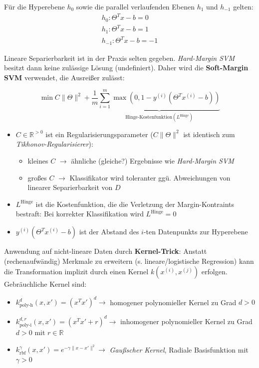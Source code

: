 Für die Hyperebene $h_0$ sowie die parallel verlaufenden Ebenen $h_1$ und $h_{-1}$ gelten:
\begin{equation*}
    \begin{split}
        h_0: \Theta^Tx-b=0\\
        h_1: \Theta^Tx-b=1\\
        h_{-1}: \Theta^Tx-b=-1
    \end{split}
\end{equation*}

Lineare Separierbarkeit ist in der Praxis selten gegeben. \emph{Hard-Margin SVM} besitzt dann keine zulässige Lösung (undefiniert). Daher wird die \textbf{Soft-Margin SVM} verwendet, die Ausreißer zulässt:

\begin{equation*}
    \min C\| \Theta \|^2 + \frac{1}{m}\underbrace{\sum_{i=1}^{m}\max(0,1-y^{(i)}(\Theta^Tx^{(i)}-b))}_{\text{Hinge-Kostenfunktion} (L^\text{Hinge})}    
\end{equation*}

\begin{itemize}
    \item $C\in\mathbb{R}^{>0}$ ist ein Regularisierungsparameter ($C\|\Theta\|^2$ ist identisch zum \emph{Tikhonov-Regularisierer}):
    \begin{itemize}
        \item kleines $C$ $\rightarrow$ ähnliche (gleiche?) Ergebnisse wie \emph{Hard-Margin SVM}
        \item großes $C$ $\rightarrow$ Klassifikator wird toleranter ggü. Abweichungen von linearer Separierbarkeit von $D$ 
    \end{itemize}
    \item $L^\text{Hinge}$ ist die Kostenfunktion, die die Verletzung der Margin-Kontraints bestraft: Bei korrekter Klassifikation wird $L^\text{Hinge}=0$
    \item $y^{(i)}(\Theta^Tx^{(i)}-b)$ ist der Abstand des $i$-ten Datenpunkts zur Hyperebene
\end{itemize}

Anwendung auf nicht-lineare Daten durch \textbf{Kernel-Trick}: Anstatt (rechenaufwändig) Merkmale zu erweitern (s. lineare/logistische Regression) kann die Transformation implizit durch einen Kernel $k(x^{(i)},x^{(j)})$ erfolgen. Gebräuchliche Kernel sind:\\

\begin{itemize}
    \item $k^d_{\text{poly-h}}(x, x')=(x^Tx')^d \rightarrow$ homogener polynomieller Kernel zu Grad $d > 0$
    \item $k^{d,r}_{\text{poly-i}}(x, x')=(x^Tx'+r)^d \rightarrow$ inhomogener polynomieller Kernel zu Grad $d > 0$ mit $r\in\mathbb{R}$
    \item $k^{\gamma}_{\text{rbf}}(x, x')=e^{-\gamma\|x-x'\|^2} \rightarrow$ \emph{Gaußscher Kernel}, Radiale Basisfunktion mit $\gamma > 0$
\end{itemize}

